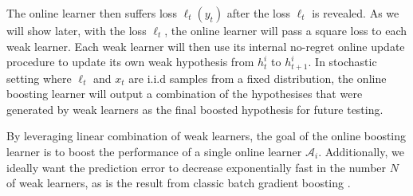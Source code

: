 The online learner then suffers loss $\ell_t(y_t)$ after the loss $\ell_t$ is revealed. As we will show later, with the loss $\ell_t$, the online learner will pass a square loss to each weak learner. Each weak learner will then use its internal no-regret online update procedure to update its own weak hypothesis from $h_t^i$ to $h_{t+1}^i$.  %
In stochastic setting where $\ell_t$ and $x_t$ are i.i.d samples from a fixed distribution, the online boosting learner will output a combination of the hypothesises that were generated by weak learners as the final boosted hypothesis for future testing.

By leveraging linear combination of weak learners, the goal of the online boosting learner is to boost the performance of a single online learner $\mathcal{A}_i$. 
Additionally, we ideally want the prediction error to decrease exponentially fast in the number $N$ of weak learners, as is the result from classic batch gradient boosting \citep{grubb2011generalized}. 


